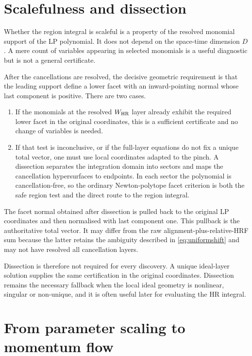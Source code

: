 \documentclass[a4paper,11pt]{article}
\newcommand{\WHR}{W_{\rm HR}}
\begin{document}
\section{Scalefulness and dissection}
\label{sec:scaleful}

Whether the region integral is scaleful is a property of the resolved
monomial support of the LP polynomial.  It does not depend on the
space-time dimension \(D\).  A mere count of variables appearing in selected
monomials is a useful diagnostic but is not a general certificate.

After the cancellations are resolved, the decisive geometric requirement is
that the leading support define a lower facet with an inward-pointing normal
whose last component is positive.  There are two cases.

\begin{enumerate}[label=(\arabic*)]
\item If the monomials at the resolved \(\WHR\) layer already exhibit the
      required lower facet in the original coordinates, this is a sufficient
      certificate and no change of variables is needed.
\item If that test is inconclusive, or if the full-layer equations do not
      fix a unique total vector, one must use local coordinates adapted to
      the pinch.  A dissection separates the integration domain into sectors
      and maps the cancellation hypersurfaces to endpoints.  In each sector
      the polynomial is cancellation-free, so the ordinary Newton-polytope
      facet criterion is both the safe region test and the direct route to
      the region integral.
\end{enumerate}

The facet normal obtained after dissection is pulled back to the original
LP coordinates and then normalised with last component one.  This
pullback is the authoritative total vector.  It may differ from the raw
alignment-plus-relative-HRF sum because the latter retains the ambiguity described
in \eqref{eq:uniformshift} and may not have resolved all cancellation layers.

Dissection is therefore not required for every discovery.  A unique
ideal-layer solution supplies the same certification in the original
coordinates.  Dissection remains the necessary fallback when the local
ideal geometry is nonlinear, singular or non-unique, and it is often useful
later for evaluating the HR integral.

\section{From parameter scaling to momentum flow}
\label{sec:momentum-reconstruction}
\end{document}
